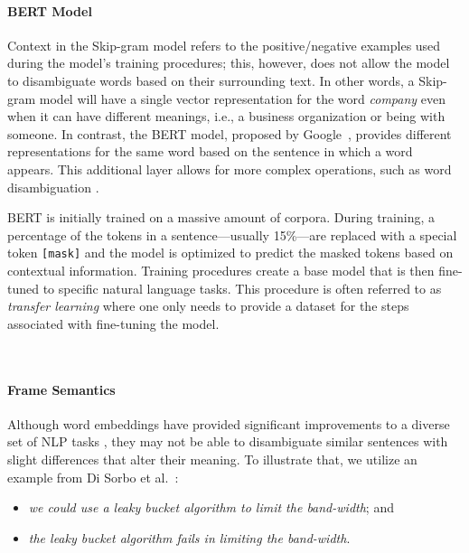 



\paragraph{\textbf{BERT Model}}
\label{cp5:bert}

Context in the Skip-gram model refers to the positive/negative examples used during the model's training procedures; this, however, does not allow the model to disambiguate words based on their surrounding text. In other words, a Skip-gram model will have a single vector representation for the word \textit{company} even when it can have different meanings, i.e., a business organization or being with someone. In contrast, 
the \acf{BERT} model, proposed by Google~\cite{Devlin2018Bert}, provides different representations for the same word based on the sentence in which a word appears.
This additional layer allows for more complex operations, such as word disambiguation .


BERT is initially trained 
on a massive amount of corpora. During training, a percentage of the tokens in a sentence---usually 15\%---are replaced with a special token \texttt{[mask]} and the model is optimized to predict the masked tokens based on contextual information. 
Training procedures create a base model that is then fine-tuned to specific natural language tasks. This procedure is often referred to as \textit{transfer learning}  where one only needs to provide a dataset for the steps associated with fine-tuning the model. 

~\cite{Lin2021}
~\cite{Araujo2021}




\paragraph{\textbf{Frame Semantics}}
\label{cp5:frame-semantics}


Although word embeddings have provided significant improvements to a diverse set of NLP tasks , they may not be able to disambiguate similar sentences with slight differences that alter their meaning. To illustrate that, we utilize an example
from Di Sorbo et al.~\cite{Sorbo2015}:


\begin{itemize}
\item  \textit{we could use a leaky bucket algorithm to limit the band-width}; and
\item \textit{the leaky bucket algorithm fails in limiting the band-width}.
\end{itemize}

